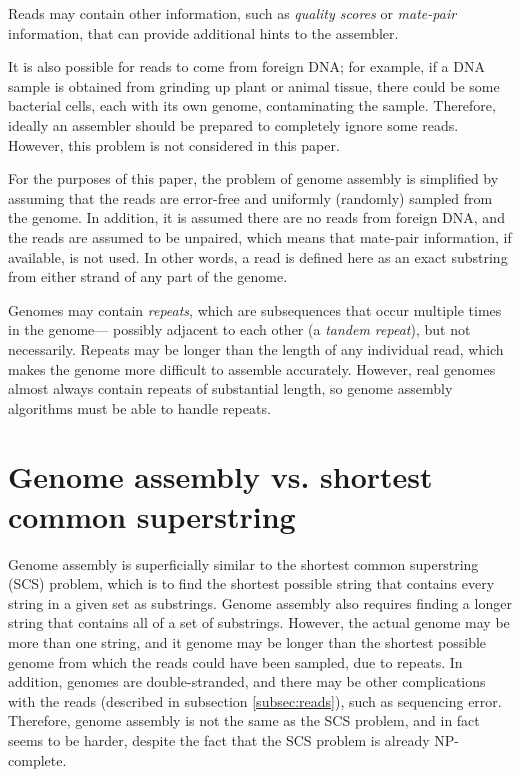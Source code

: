 \documentclass[10pt]{article}
\newcommand{\KeyTerm}[1]{{\it #1}}
\begin{document}
Reads may contain other information, such as \KeyTerm{quality scores} or
\KeyTerm{mate-pair} information, that can provide additional hints to the
assembler.

It is also possible for reads to come from foreign DNA; for example, if a DNA
sample is obtained from grinding up plant or animal tissue, there could be some
bacterial cells, each with its own genome, contaminating the sample.  Therefore,
ideally an assembler should be prepared to completely ignore some reads.
However, this problem is not considered in this paper.

For the purposes of this paper, the problem of genome assembly is simplified by
assuming that the reads are error-free and uniformly (randomly) sampled from the
genome.  In addition, it is assumed there are no reads from foreign DNA, and the
reads are assumed to be unpaired, which means that mate-pair information, if
available, is not used.  In other words, a read is defined here as an exact
substring from either strand of any part of the genome.

Genomes may contain \KeyTerm{repeats}, which are subsequences that occur
multiple times in the genome--- possibly adjacent to each other (a
\KeyTerm{tandem repeat}), but not necessarily.  Repeats may be longer than the
length of any individual read, which makes the genome more difficult to assemble
accurately.  However, real genomes almost always contain repeats of substantial
length, so genome assembly algorithms must be able to handle repeats.

\section{Genome assembly vs. shortest common superstring}

Genome assembly is superficially similar to the shortest common superstring
(SCS) problem, which is to find the shortest possible string that contains every
string in a given set as substrings.  Genome assembly also requires finding a
longer string that contains all of a set of substrings.  However, the actual
genome may be more than one string, and it genome may be longer than the
shortest possible genome from which the reads could have been sampled, due to
repeats.  In addition,  genomes are double-stranded, and there may be other
complications with the reads (described in subsection \ref{subsec:reads}), such
as sequencing error.  Therefore, genome assembly is not the same as the SCS
problem, and in fact seems to be harder, despite the fact that the SCS problem
is already NP-complete\cite{Turner1989}.
\end{document}
